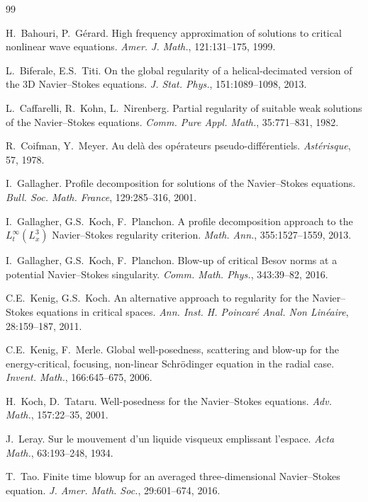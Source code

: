 \documentclass[11pt]{article}
\theoremstyle{definition}
\begin{document}
\begin{thebibliography}{99}

H.~Bahouri, P.~G\'erard.
\newblock High frequency approximation of solutions to critical nonlinear wave equations.
\newblock \emph{Amer. J. Math.}, 121:131--175, 1999.

L.~Biferale, E.S.~Titi.
\newblock On the global regularity of a helical-decimated version of the 3D Navier--Stokes equations.
\newblock \emph{J. Stat. Phys.}, 151:1089--1098, 2013.

L.~Caffarelli, R.~Kohn, L.~Nirenberg.
\newblock Partial regularity of suitable weak solutions of the Navier--Stokes equations.
\newblock \emph{Comm. Pure Appl. Math.}, 35:771--831, 1982.

R.~Coifman, Y.~Meyer.
\newblock Au del\`a des op\'erateurs pseudo-diff\'erentiels.
\newblock \emph{Ast\'erisque}, 57, 1978.

I.~Gallagher.
\newblock Profile decomposition for solutions of the Navier--Stokes equations.
\newblock \emph{Bull. Soc. Math. France}, 129:285--316, 2001.

I.~Gallagher, G.S.~Koch, F.~Planchon.
\newblock A profile decomposition approach to the $L^\infty_t(L^3_x)$ Navier--Stokes regularity criterion.
\newblock \emph{Math. Ann.}, 355:1527--1559, 2013.

I.~Gallagher, G.S.~Koch, F.~Planchon.
\newblock Blow-up of critical Besov norms at a potential Navier--Stokes singularity.
\newblock \emph{Comm. Math. Phys.}, 343:39--82, 2016.

C.E.~Kenig, G.S.~Koch.
\newblock An alternative approach to regularity for the Navier--Stokes equations in critical spaces.
\newblock \emph{Ann. Inst. H. Poincar\'e Anal. Non Lin\'eaire}, 28:159--187, 2011.

C.E.~Kenig, F.~Merle.
\newblock Global well-posedness, scattering and blow-up for the energy-critical, focusing, non-linear Schr\"odinger equation in the radial case.
\newblock \emph{Invent. Math.}, 166:645--675, 2006.

H.~Koch, D.~Tataru.
\newblock Well-posedness for the Navier--Stokes equations.
\newblock \emph{Adv. Math.}, 157:22--35, 2001.

J.~Leray.
\newblock Sur le mouvement d'un liquide visqueux emplissant l'espace.
\newblock \emph{Acta Math.}, 63:193--248, 1934.

T.~Tao.
\newblock Finite time blowup for an averaged three-dimensional Navier--Stokes equation.
\newblock \emph{J. Amer. Math. Soc.}, 29:601--674, 2016.

\end{thebibliography}
\end{document}
